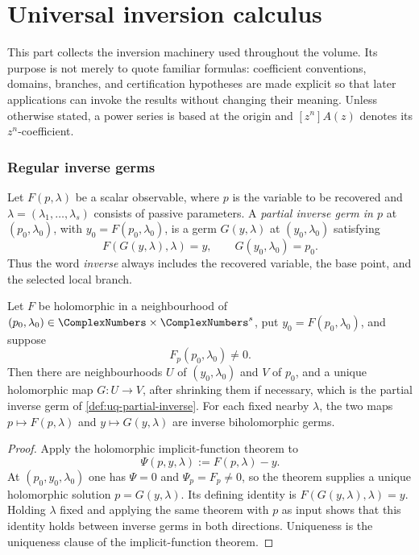\part{Universal inversion calculus}

This part collects the inversion machinery used throughout the volume.  Its
purpose is not merely to quote familiar formulas: coefficient conventions,
domains, branches, and certification hypotheses are made explicit so that
later applications can invoke the results without changing their meaning.
Unless otherwise stated, a power series is based at the origin and
\([z^n]A(z)\) denotes its \(z^n\)-coefficient.

\section{Regular inverse germs}
\label{sec:uq-regular-germs}

\begin{definition}
\label{def:uq-partial-inverse}
Let \(F(p,\lambda)\) be a scalar observable, where \(p\) is the variable to be
recovered and \(\lambda=(\lambda_1,\ldots,\lambda_s)\) consists of passive
parameters.  A \emph{partial inverse germ in \(p\)} at
\((p_0,\lambda_0)\), with \(y_0=F(p_0,\lambda_0)\), is a germ
\(G(y,\lambda)\) at \((y_0,\lambda_0)\) satisfying
\[
 F(G(y,\lambda),\lambda)=y,
 \qquad
 G(y_0,\lambda_0)=p_0.
\]
Thus the word \emph{inverse} always includes the recovered variable, the
base point, and the selected local branch.
\end{definition}

\begin{theorem}
\label{thm:uq-regular-analytic-inverse}
Let \(F\) be holomorphic in a neighbourhood of
\((p_0,\lambda_0)\in\ComplexNumbers\times\ComplexNumbers^s\), put
\(y_0=F(p_0,\lambda_0)\), and suppose
\[
 F_p(p_0,\lambda_0)\ne0.
\]
Then there are neighbourhoods \(U\) of \((y_0,\lambda_0)\) and \(V\) of
\(p_0\), and a unique holomorphic map \(G\colon U\to V\), after shrinking
them if necessary, which is the partial inverse germ of
\cref{def:uq-partial-inverse}.  For each fixed nearby \(\lambda\), the two
maps \(p\mapsto F(p,\lambda)\) and \(y\mapsto G(y,\lambda)\) are inverse
biholomorphic germs.
\end{theorem}

\begin{proof}
Apply the holomorphic implicit-function theorem to
\[
 \Psi(p,y,\lambda):=F(p,\lambda)-y.
\]
At \((p_0,y_0,\lambda_0)\) one has \(\Psi=0\) and
\(\Psi_p=F_p\ne0\), so the theorem supplies a unique holomorphic solution
\(p=G(y,\lambda)\).  Its defining identity is
\(F(G(y,\lambda),\lambda)=y\).  Holding \(\lambda\) fixed and applying the
same theorem with \(p\) as input shows that this identity holds between
inverse germs in both directions.  Uniqueness is the uniqueness clause of
the implicit-function theorem.
\end{proof}

